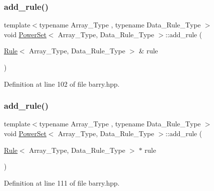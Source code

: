 \subsubsection{\texorpdfstring{add\+\_\+rule()}{add\_rule()}\hspace{0.1cm}{\footnotesize\ttfamily [1/3]}}
{\footnotesize\ttfamily template$<$typename Array\+\_\+\+Type , typename Data\+\_\+\+Rule\+\_\+\+Type $>$ \\
void \hyperlink{classbarry_1_1_power_set}{Power\+Set}$<$ Array\+\_\+\+Type, Data\+\_\+\+Rule\+\_\+\+Type $>$\+::add\+\_\+rule (\begin{DoxyParamCaption}\item[{\hyperlink{classbarry_1_1_rule}{Rule}$<$ Array\+\_\+\+Type, Data\+\_\+\+Rule\+\_\+\+Type $>$ \&}]{rule }\end{DoxyParamCaption})\hspace{0.3cm}{\ttfamily [inline]}}



Definition at line 102 of file barry.\+hpp.

\mbox{\label{classbarry_1_1_power_set_a6cb8fb8f09b4c190e2ac6c07daa1241e}} 
\subsubsection{\texorpdfstring{add\+\_\+rule()}{add\_rule()}\hspace{0.1cm}{\footnotesize\ttfamily [2/3]}}
{\footnotesize\ttfamily template$<$typename Array\+\_\+\+Type , typename Data\+\_\+\+Rule\+\_\+\+Type $>$ \\
void \hyperlink{classbarry_1_1_power_set}{Power\+Set}$<$ Array\+\_\+\+Type, Data\+\_\+\+Rule\+\_\+\+Type $>$\+::add\+\_\+rule (\begin{DoxyParamCaption}\item[{\hyperlink{classbarry_1_1_rule}{Rule}$<$ Array\+\_\+\+Type, Data\+\_\+\+Rule\+\_\+\+Type $>$ $\ast$}]{rule }\end{DoxyParamCaption})\hspace{0.3cm}{\ttfamily [inline]}}



Definition at line 111 of file barry.\+hpp.

\mbox{\label{classbarry_1_1_power_set_aae5eae12186fff037efa3884ac2b3dcc}} 
